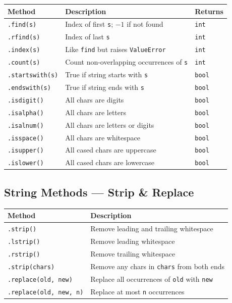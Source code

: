 \documentclass[oneside]{book}
\begin{document}
\begin{center}
\begin{tabularx}{\linewidth}{lXl}
\toprule
\textbf{Method} & \textbf{Description} & \textbf{Returns} \\
\midrule
\texttt{.find(s)}       & Index of first \texttt{s}; $-1$ if not found & \texttt{int} \\
\texttt{.rfind(s)}      & Index of last \texttt{s}                     & \texttt{int} \\
\texttt{.index(s)}      & Like \texttt{find} but raises \texttt{ValueError}  & \texttt{int} \\
\texttt{.count(s)}      & Count non-overlapping occurrences of \texttt{s}    & \texttt{int} \\
\texttt{.startswith(s)} & True if string starts with \texttt{s}        & \texttt{bool} \\
\texttt{.endswith(s)}   & True if string ends with \texttt{s}          & \texttt{bool} \\
\texttt{.isdigit()}     & All chars are digits                         & \texttt{bool} \\
\texttt{.isalpha()}     & All chars are letters                        & \texttt{bool} \\
\texttt{.isalnum()}     & All chars are letters or digits              & \texttt{bool} \\
\texttt{.isspace()}     & All chars are whitespace                     & \texttt{bool} \\
\texttt{.isupper()}     & All cased chars are uppercase                & \texttt{bool} \\
\texttt{.islower()}     & All cased chars are lowercase                & \texttt{bool} \\
\bottomrule
\end{tabularx}
\end{center}

\subsection*{String Methods — Strip \& Replace}

\begin{center}
\begin{tabularx}{\linewidth}{lX}
\toprule
\textbf{Method} & \textbf{Description} \\
\midrule
\texttt{.strip()}               & Remove leading and trailing whitespace \\
\texttt{.lstrip()}              & Remove leading whitespace \\
\texttt{.rstrip()}              & Remove trailing whitespace \\
\texttt{.strip(chars)}          & Remove any chars in \texttt{chars} from both ends \\
\texttt{.replace(old, new)}     & Replace all occurrences of \texttt{old} with \texttt{new} \\
\texttt{.replace(old, new, n)}  & Replace at most \texttt{n} occurrences \\
\bottomrule
\end{tabularx}
\end{center}
\end{document}
